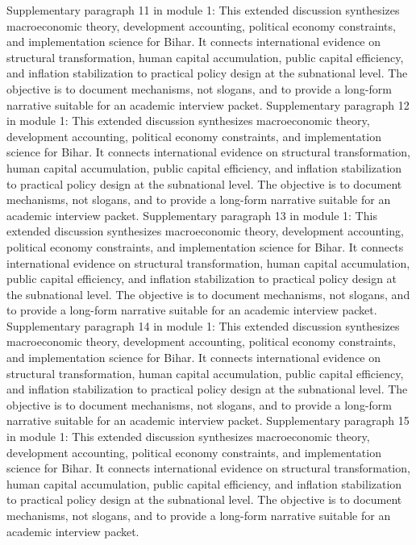 \documentclass[preprint,12pt]{elsarticle}
\begin{document}
Supplementary paragraph 11 in module 1: This extended discussion synthesizes macroeconomic theory, development accounting, political economy constraints, and implementation science for Bihar. It connects international evidence on structural transformation, human capital accumulation, public capital efficiency, and inflation stabilization to practical policy design at the subnational level. The objective is to document mechanisms, not slogans, and to provide a long-form narrative suitable for an academic interview packet.
Supplementary paragraph 12 in module 1: This extended discussion synthesizes macroeconomic theory, development accounting, political economy constraints, and implementation science for Bihar. It connects international evidence on structural transformation, human capital accumulation, public capital efficiency, and inflation stabilization to practical policy design at the subnational level. The objective is to document mechanisms, not slogans, and to provide a long-form narrative suitable for an academic interview packet.
Supplementary paragraph 13 in module 1: This extended discussion synthesizes macroeconomic theory, development accounting, political economy constraints, and implementation science for Bihar. It connects international evidence on structural transformation, human capital accumulation, public capital efficiency, and inflation stabilization to practical policy design at the subnational level. The objective is to document mechanisms, not slogans, and to provide a long-form narrative suitable for an academic interview packet.
Supplementary paragraph 14 in module 1: This extended discussion synthesizes macroeconomic theory, development accounting, political economy constraints, and implementation science for Bihar. It connects international evidence on structural transformation, human capital accumulation, public capital efficiency, and inflation stabilization to practical policy design at the subnational level. The objective is to document mechanisms, not slogans, and to provide a long-form narrative suitable for an academic interview packet.
Supplementary paragraph 15 in module 1: This extended discussion synthesizes macroeconomic theory, development accounting, political economy constraints, and implementation science for Bihar. It connects international evidence on structural transformation, human capital accumulation, public capital efficiency, and inflation stabilization to practical policy design at the subnational level. The objective is to document mechanisms, not slogans, and to provide a long-form narrative suitable for an academic interview packet.
\end{document}
